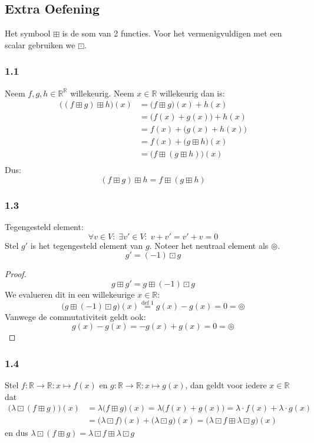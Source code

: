 \documentclass[lineaire_algebra_oplossingen.tex]{subfiles}
\begin{document}
\subsection{Extra Oefening}
Het symbool $\boxplus$ is de som van 2 functies. Voor het vermenigvuldigen met een scalar gebruiken we $\boxdot$.
\subsubsection*{1.1}
Neem $f,g,h \in \mathbb{R}^{\mathbb{R}}$ willekeurig. Neem $x \in \mathbb{R}$ willekeurig dan is:
\begin{align*}
\big( (f \boxplus g) \boxplus h \big) (x)
&= \big( f \boxplus g \big)(x) + h(x)\\
&= \big( f(x) + g(x) \big) + h(x)\\
&= f(x) + \big( g(x) + h(x) \big)\\
&= f(x) + \big( g \boxplus h\big) (x)\\
&= \big( f \boxplus (g \boxplus h) \big) (x)\\
\end{align*}
Dus:
\[
(f \boxplus g) \boxplus h = f \boxplus (g \boxplus h)
\]
\subsubsection*{1.3}
Tegengesteld element:
\[
\forall v \in V:\;\exists v' \in V:\; v+v'=v'+v=0
\]
Stel $g'$ is het tegengesteld element van $g$.
Noteer het neutraal element als $\circledcirc$.
\[
g' = (-1) \boxdot g
\]
\begin{proof}
\[
g \boxplus g' = g \boxplus (-1) \boxdot g
\]
We evalueren dit in een willekeurige $x \in \mathbb{R}$:
\[ 
\big( g\boxplus (-1) \boxdot g \big)(x) \overset{\text{def 1}}{=} g(x) -g(x) = 0 = \circledcirc
\]
Vanwege de commutativiteit geldt ook:
\[
g(x) -g(x) = -g(x) + g(x) = 0 = \circledcirc
\]
\end{proof}
\subsubsection{1.4}
Stel $f:\mathbb{R} \rightarrow \mathbb{R}: x \mapsto f(x)$ en $g:\mathbb{R} \rightarrow \mathbb{R}: x \mapsto g(x)$, dan geldt voor iedere $x \in \mathbb{R}$ dat
\begin{align*}
\big( \lambda \boxdot (f \boxplus g) \big)(x) 
    &= \lambda \big( f \boxplus g \big)(x) 
     = \lambda \big( f(x) + g(x) \big)
     = \lambda \cdot f(x) + \lambda \cdot g(x) \\
    &= \big( \lambda \boxdot f \big)(x) + \big( \lambda \boxdot g \big)(x)
     = \big( \lambda \boxdot f \boxplus \lambda \boxdot g \big)(x)
\end{align*}
en dus $\lambda \boxdot (f \boxplus g) = \lambda \boxdot f \boxplus \lambda \boxdot g $
\end{document}

